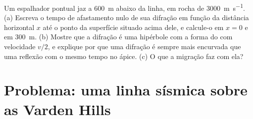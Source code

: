 \begin{exercise}[$\star\star\star$]\label{exo:b3:exploration-seismology:12}
Um espalhador pontual jaz a \qty{600}{m} abaixo da linha, em rocha de
\qty{3000}{m.s^{-1}}. (a) Escreva o tempo de afastamento nulo de sua difração em função
da distância horizontal $x$ até o ponto da superfície situado acima dele, e calcule-o em $x = 0$
e em \qty{300}{m}. (b) Mostre que a difração é uma hipérbole com a forma do 
com velocidade $v/2$, e explique por que uma difração é sempre mais encurvada que uma
reflexão com o mesmo tempo no ápice. (c) O que a migração faz com ela?
\end{exercise}

\section{Problema: uma linha sísmica sobre as Varden Hills}

